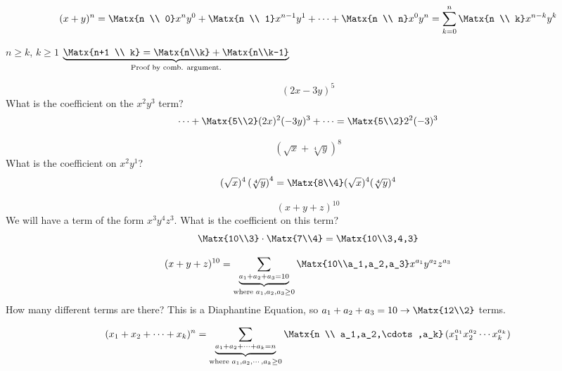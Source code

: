 \[ (x+y)^n = \Matx{n \\ 0}x^ny^0+\Matx{n \\ 1}x^{n-1}y^1+\cdots+\Matx{n \\ n}x^0y^n=\sum^n_{k=0}\Matx{n \\ k}x^{n-k}y^k\]

\begin{theorem}
$n \ge k$, $k \ge 1$ $\underbrace{\Matx{n+1 \\ k}=\Matx{n\\k}+\Matx{n\\k-1}}_{\text{Proof by comb. argument.}}$
\end{theorem}
\begin{example}
\[ \left( 2x - 3y \right)^5 \]
What is the coefficient on the $x^2y^3$ term?
\[ \cdots + \Matx{5\\2}(2x)^2(-3y)^3 + \cdots = \Matx{5\\2}2^2(-3)^3\]
\end{example}
\begin{example}
\[ \left( \sqrt{x} + \sqrt[4]{y} \right)^8\]
What is the coefficient on $x^2y^1$?
\[ (\sqrt{x})^4\left( \sqrt[4]{y}\right)^4 = \Matx{8\\4}(\sqrt{x})^4(\sqrt[4]{y})^4 \]
\end{example}
\begin{example}
\[ (x+y+z)^{10} \]
We will have a term of the form $x^3y^4z^3$. What is the coefficient on this term?
\[ \Matx{10\\3} \cdot \Matx{7\\4} = \Matx{10\\3,4,3}\]
\end{example}
\begin{example}
\[ (x+y+z)^{10} = \underbrace{\sum_{a_1+a_2+a_3=10}}_{\text{where }a_1,a_2,a_3\ge0} \Matx{10\\a_1,a_2,a_3}x^{a_1}y^{a_2}z^{a_3}\]
How many different terms are there? This is a Diaphantine Equation, so $a_1+a_2+a_3=10 \to \Matx{12\\2}$ terms.
\end{example}
\begin{theorem}
\[ (x_1+x_2+\cdots+x_k)^n = \underbrace{\sum_{a_1+a_2+\cdots+a_k=n}}_{\text{where }a_1,a_2,\cdots,a_k\ge0} \Matx{n \\ a_1,a_2,\cdots,a_k}\left( x_1^{a_1}x_2^{a_2}\cdots x_k^{a_k}\right) \]
\end{theorem}
